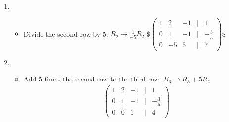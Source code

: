 \documentclass[letterpaper,10pt,english]{jupyterBook}
\begin{document}
\begin{enumerate}
%
\setcounter{enumi}{2}
\item {} 
\sphinxAtStartPar
{}
\begin{itemize}
\item {} 
\sphinxAtStartPar
Divide the second row by \sphinxhyphen{}5:
\(R_2 \rightarrow \frac{1}{-5}R_2\)
\$\(\begin{pmatrix}
1 & 2 & -1 & \vert & 1 \\
0 & 1 & -1 & \vert & -\frac{3}{5} \\
0 & -5 & 6 & \vert & 7
\end{pmatrix}
\)\$

\end{itemize}

\item {} 
\sphinxAtStartPar
{}
\begin{itemize}
\item {} 
\sphinxAtStartPar
Add 5 times the second row to the third row:
\(R_3 \rightarrow R_3 + 5R_2\)
\begin{equation*}
\begin{split}\begin{pmatrix}
     1 & 2 & -1 & \vert & 1 \\
     0 & 1 & -1 & \vert & -\frac{3}{5} \\
     0 & 0 & 1 & \vert & 4
     \end{pmatrix}
     \end{split}
\end{equation*}
\end{itemize}


\end{enumerate}
\end{document}
